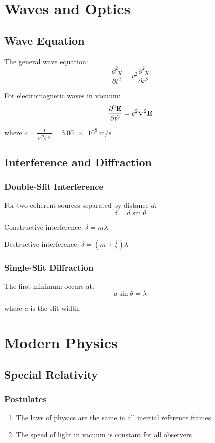 \documentclass[11pt]{book}
\begin{document}
\chapter{Waves and Optics}

\section{Wave Equation}

The general wave equation:
\[ \frac{\partial^2 y}{\partial t^2} = v^2 \frac{\partial^2 y}{\partial x^2} \]

For electromagnetic waves in vacuum:
\[ \frac{\partial^2 \mathbf{E}}{\partial t^2} = c^2 \nabla^2 \mathbf{E} \]

where $c = \frac{1}{\sqrt{\mu_0\epsilon_0}} = \SI{3.00e8}{\meter\per\second}$

\section{Interference and Diffraction}

\subsection{Double-Slit Interference}

For two coherent sources separated by distance $d$:
\[ \delta = d\sin\theta \]

Constructive interference: $\delta = m\lambda$

Destructive interference: $\delta = (m + \frac{1}{2})\lambda$

\subsection{Single-Slit Diffraction}

The first minimum occurs at:
\[ a\sin\theta = \lambda \]

where $a$ is the slit width.

\chapter{Modern Physics}

\section{Special Relativity}

\subsection{Postulates}
\begin{enumerate}
    \item The laws of physics are the same in all inertial reference frames
    \item The speed of light in vacuum is constant for all observers
\end{enumerate}
\end{document}
